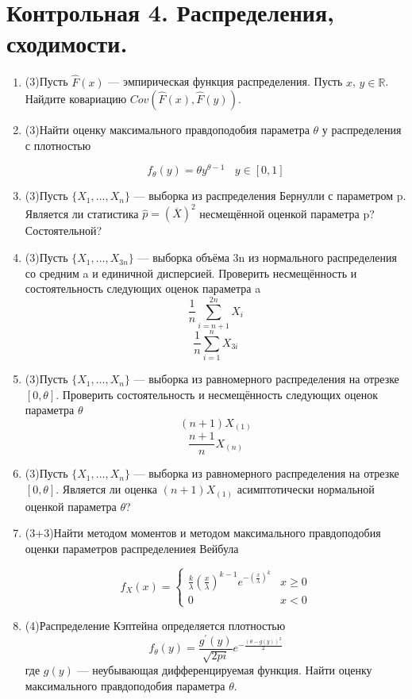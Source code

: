 \documentclass[a4paper, 14pt]{extarticle}
\begin{document}
\section*{Контрольная 4. Распределения, сходимости.} 
\begin{enumerate}

\item (3)Пусть $\hat F(x)$ --- эмпирическая функция распределения. Пусть $x$, $y \in \mathbb{R}$. Найдите ковариацию $Cov(\hat F(x), \hat F(y))$.

\item (3)Найти оценку максимального правдоподобия параметра $\theta$ у распределения с плотностью

$$f_{\theta}(y) = \theta y^{\theta - 1} ~~~~ y\in[0,1]$$

\item (3)Пусть  $\{X_1 ,\ldots , X_{n}\}$ — выборка из распределения Бернулли
с параметром p. Является ли статистика $\hat{p} = (\overline{X})^2$ несмещённой
оценкой параметра p? Состоятельной?

\item (3)Пусть $\{X_1 ,\ldots , X_{3n}\}$ — выборка объёма 3n из нормального
распределения со средним a и единичной дисперсией. Проверить
несмещённость и состоятельность следующих оценок параметра a
$$\frac{1}{n}\sum_{i=n+1}^{2n}X_i$$
$$\frac{1}{n}\sum_{i=1}^{n}X_{3i}$$

\item (3)Пусть $\{X_1 ,\ldots , X_{n}\}$ — выборка из равномерного распределения на отрезке $[0, \theta]$. Проверить состоятельность и несмещённость
следующих оценок параметра $\theta$
$$(n+1)X_{(1)}$$
$$\frac{n+1}{n}X_{(n)}$$

\item (3)Пусть $\{X_1 ,\ldots , X_{n}\}$ — выборка из равномерного распределения на отрезке $[0, \theta]$. Является ли оценка $(n+1)X_{(1)}$ 
асимптотически нормальной оценкой параметра $\theta$?

\item (3+3)Найти методом моментов и методом максимального правдоподобия оценки параметров распределениея Вейбула

$$f_{X}(x) = \begin{cases}
\frac{k}{\lambda}(\frac{x}{\lambda})^{k-1}e^{-(\frac{x}{\lambda})^{k}} & x\geq 0 \\
0 & x<0 
\end{cases}$$

\item (4)Распределение Кэптейна определяется плотностью
$$f_{\theta}(y) = \frac{g^{'}(y)}{\sqrt{2pi}}e^{-\frac{(\theta - g(y))^2}{2}}$$
где $g(y)$ — неубывающая дифференцируемая функция. 
Найти оценку максимального правдоподобия параметра $\theta$.

\end{enumerate}
\end{document}
